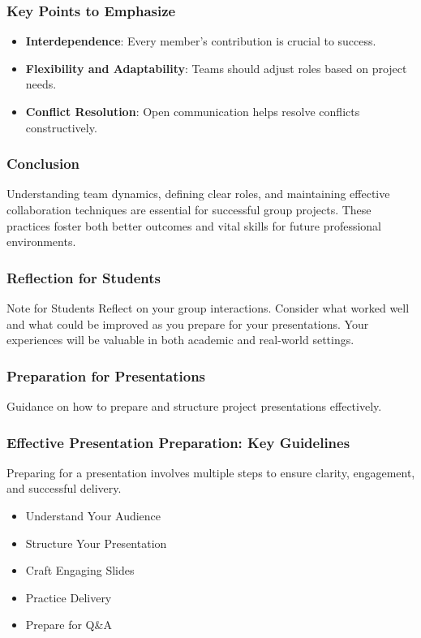 \documentclass[aspectratio=169]{beamer}
\begin{document}
\begin{frame}[fragile]
    \frametitle{Key Points to Emphasize}
    \begin{itemize}
        \item \textbf{Interdependence}: Every member's contribution is crucial to success.
        \item \textbf{Flexibility and Adaptability}: Teams should adjust roles based on project needs.
        \item \textbf{Conflict Resolution}: Open communication helps resolve conflicts constructively.
    \end{itemize}
\end{frame}

\begin{frame}[fragile]
    \frametitle{Conclusion}
    Understanding team dynamics, defining clear roles, and maintaining effective collaboration techniques are essential for successful group projects. These practices foster both better outcomes and vital skills for future professional environments.
\end{frame}

\begin{frame}[fragile]
    \frametitle{Reflection for Students}
    \begin{block}{Note for Students}
        Reflect on your group interactions. Consider what worked well and what could be improved as you prepare for your presentations. Your experiences will be valuable in both academic and real-world settings.
    \end{block}
\end{frame}

\begin{frame}[fragile]
    \frametitle{Preparation for Presentations}
    Guidance on how to prepare and structure project presentations effectively.
\end{frame}

\begin{frame}[fragile]
    \frametitle{Effective Presentation Preparation: Key Guidelines}
    Preparing for a presentation involves multiple steps to ensure clarity, engagement, and successful delivery.
    \begin{itemize}
        \item Understand Your Audience
        \item Structure Your Presentation
        \item Craft Engaging Slides
        \item Practice Delivery
        \item Prepare for Q\&A
    \end{itemize}
\end{frame}
\end{document}
